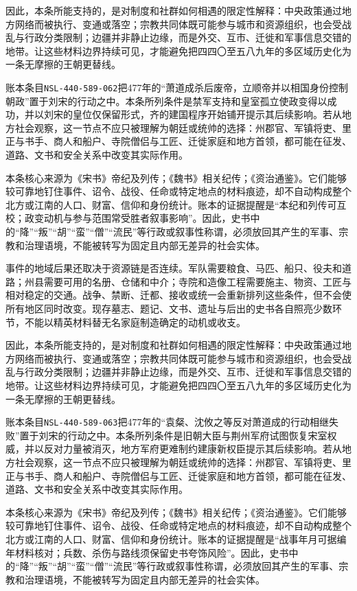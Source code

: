 因此，本条所能支持的，是对制度和社群如何相遇的限定性解释：中央政策通过地方网络而被执行、变通或落空；宗教共同体既可能参与城市和资源组织，也会受战乱与行政分类限制；边疆并非静止边缘，而是外交、互市、迁徙和军事信息交错的地带。让这些材料边界持续可见，才能避免把四四〇至五八九年的多区域历史化为一条无摩擦的王朝更替线。

账本条目\texttt{NSL-440-589-062}把477年的“萧道成杀后废帝，立顺帝并以相国身份控制朝政”置于刘宋的行动之中。本条所列条件是禁军支持和皇室孤立使政变得以成功，并以刘宋的皇位仅保留形式，齐的建国程序开始铺开提示其后续影响。若从地方社会观察，这一节点不应只被理解为朝廷或统帅的选择：州郡官、军镇将吏、里正与书手、商人和船户、寺院僧侣与工匠、迁徙家庭和地方首领，都可能在征发、道路、文书和安全关系中改变其实际作用。

本条核心来源为《宋书》帝纪及列传；《魏书》相关纪传；《资治通鉴》。它们能够较可靠地钉住事件、诏令、战役、任命或特定地点的材料痕迹，却不自动构成整个北方或江南的人口、财富、信仰和身份统计。账本的证据提醒是“本纪和列传可互校；政变动机与参与范围常受胜者叙事影响”。因此，史书中的“降”“叛”“胡”“蛮”“僧”“流民”等行政或叙事性称谓，必须放回其产生的军事、宗教和治理语境，不能被转写为固定且内部无差异的社会实体。

事件的地域后果还取决于资源链是否连续。军队需要粮食、马匹、船只、役夫和道路；州县需要可用的名册、仓储和中介；寺院和造像工程需要施主、物资、工匠与相对稳定的交通。战争、禁断、迁都、接收或统一会重新排列这些条件，但不会使所有地区同时改变。现存墓志、题记、文书、遗址与后出的史书各自照亮少数环节，不能以精英材料替无名家庭制造确定的动机或收支。

因此，本条所能支持的，是对制度和社群如何相遇的限定性解释：中央政策通过地方网络而被执行、变通或落空；宗教共同体既可能参与城市和资源组织，也会受战乱与行政分类限制；边疆并非静止边缘，而是外交、互市、迁徙和军事信息交错的地带。让这些材料边界持续可见，才能避免把四四〇至五八九年的多区域历史化为一条无摩擦的王朝更替线。

账本条目\texttt{NSL-440-589-063}把477年的“袁粲、沈攸之等反对萧道成的行动相继失败”置于刘宋的行动之中。本条所列条件是旧朝大臣与荆州军府试图恢复宋室权威，并以反对力量被消灭，地方军府更难制约建康新权臣提示其后续影响。若从地方社会观察，这一节点不应只被理解为朝廷或统帅的选择：州郡官、军镇将吏、里正与书手、商人和船户、寺院僧侣与工匠、迁徙家庭和地方首领，都可能在征发、道路、文书和安全关系中改变其实际作用。

本条核心来源为《宋书》帝纪及列传；《魏书》相关纪传；《资治通鉴》。它们能够较可靠地钉住事件、诏令、战役、任命或特定地点的材料痕迹，却不自动构成整个北方或江南的人口、财富、信仰和身份统计。账本的证据提醒是“战事年月可据编年材料核对；兵数、杀伤与路线须保留史书夸饰风险”。因此，史书中的“降”“叛”“胡”“蛮”“僧”“流民”等行政或叙事性称谓，必须放回其产生的军事、宗教和治理语境，不能被转写为固定且内部无差异的社会实体。

